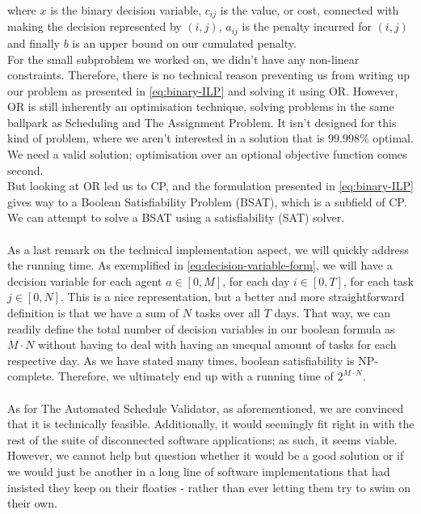 where \(x\) is the binary decision variable, \(c_{ij}\) is the value, or cost, connected with making the decision represented by \( (i,j) \), \( a_{ij} \) is the penalty incurred for \( (i,j) \) and finally \(b\) is an upper bound on our cumulated penalty.
\\
For the small subproblem we worked on, we didn't have any non-linear constraints. Therefore, there is no technical reason preventing us from writing up our problem as presented in \autoref{eq:binary-ILP} and solving it using OR. However, OR is still inherently an optimisation technique, solving problems in the same ballpark as Scheduling and The Assignment Problem. It isn't designed for this kind of problem, where we aren't interested in a solution that is \(99.998\%\) optimal. We need a valid solution; optimisation over an optional objective function comes second.
\\
But looking at OR led us to CP, and the formulation presented in \autoref{eq:binary-ILP} gives way to a Boolean Satisfiability Problem (BSAT), which is a subfield of CP. We can attempt to solve a BSAT using a satisfiability (SAT) solver.
\\
\\
As a last remark on the technical implementation aspect, we will quickly address the running time. As exemplified in \autoref{eq:decision-variable-form}, we will have a decision variable for each agent \(a \in [0, M]\), for each day \(i \in [0, T]\), for each task \(j \in [0, N]\). This is a nice representation, but a better and more straightforward definition is that we have a sum of \(N\) tasks over all \(T\) days. That way, we can readily define the total number of decision variables in our boolean formula as \(M \cdot N\) without having to deal with having an unequal amount of tasks for each respective day. As we have stated many times, boolean satisfiability is NP-complete. Therefore, we ultimately end up with a running time of \(2^{M \cdot N}\).
\\
\\
As for The Automated Schedule Validator, as aforementioned, we are convinced that it is technically feasible. Additionally, it would seemingly fit right in with the rest of the suite of disconnected software applications; as such, it seems viable. However, we cannot help but question whether it would be a good solution or if we would just be another in a long line of software implementations that had insisted they keep on their floaties - rather than ever letting them try to swim on their own.